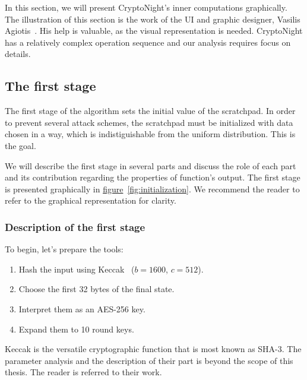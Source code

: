 In this section, we will present CryptoNight's inner computations graphically. The illustration of this section is the work of the UI and graphic designer, Vasilis Agiotis~\cite{bill}. His help is valuable, as the visual representation is needed. CryptoNight has a relatively complex operation sequence and our analysis requires focus on details.

\subsection{The first stage} \label{sec:first}
The first stage of the algorithm sets the initial value of the scratchpad. In order to prevent several attack schemes, the scratchpad must be initialized with data chosen in a way, which is indistiguishable from the uniform distribution. This is the goal.

We will describe the first stage in several parts and discuss the role of each part and its contribution regarding the properties of function's output. The first stage is presented graphically in \hyperref[fig:initialization]{figure}~\ref{fig:initialization}. We recommend the reader to refer to the graphical representation for clarity.
\pagebreak

\subsubsection{Description of the first stage}
To begin, let's prepare the tools:
\begin{enumerate}
  \item \label{hashing} Hash the input using Keccak~\cite{keccak} ($b=1600$, $c=512$).
  \item Choose the first 32 bytes of the final state.
  \item Interpret them as an AES-256 key.
  \item Expand them to 10 round keys.
\end{enumerate}

Keccak is the versatile cryptographic function that is most known as SHA-3. The parameter analysis and the description of their part is beyond the scope of this thesis. The reader is referred to their work.

